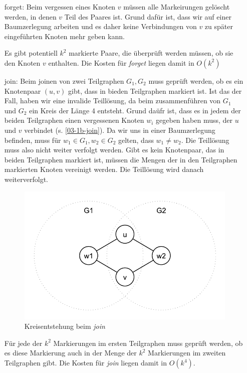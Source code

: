 \begin{itemize}
\item[forget: ]Beim vergessen eines Knoten $v$ müssen alle Markeirungen gelöscht werden, in denen $v$ Teil des Paares ist. Grund dafür ist, dass wir auf einer Baumzerlegung arbeiten und es daher keine Verbindungen von $v$ zu später eingeführten Knoten mehr geben kann.

Es gibt potentiell $k^2$ markierte Paare, die überprüft werden müssen, ob sie den Knoten $v$ enthalten. Die Kosten für \textit{forget} liegen damit in $O(k^2)$

\item[join: ]Beim joinen von zwei Teilgraphen $G_1, G_2$ muss geprüft werden, ob es ein Knotenpaar $(u,v)$ gibt, dass in bieden Teilgraphen markiert ist. Ist das der Fall, haben wir eine invalide Teillösung, da beim zusammenführen von $G_1$ und $G_2$ ein Kreis der Länge 4 entsteht. Grund daüfr ist, dass es in jedem der beiden Teilgraphen einen vergessenen Knoten $w_i$ gegeben haben muss, der $u$ und $v$ verbindet (s. \autoref{03-1b-join}). Da wir uns in einer Baumzerlegung befinden, muss für $w_1\in G_1, w_2\in G_2$ gelten, dass $w_1\neq w_2$. Die Teillösung muss also nicht weiter verfolgt werden. Gibt es kein Knotenpaar, das in beiden Teilgraphen markiert ist, müssen die Mengen der in den Teilgraphen markierten Knoten vereinigt werden. Die Teillösung wird danach weiterverfolgt.

\begin{figure}[h]
	\center		
	\includegraphics[scale=0.5]{fig/03-1b-join}
	\caption{Kreisentstehung beim \textit{join}}
	\label{03-1b-join}
\end{figure}

Für jede der $k^2$ Markierungen im ersten Teilgraphen muss geprüft werden, ob es diese Markierung auch in der Menge der $k^2$ Markierungen im zweiten Teilgraphen gibt. Die Kosten für \textit{join} liegen damit in $O(k^4)$.
\end{itemize}

